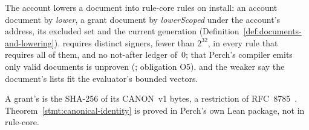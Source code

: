 The account lowers a document into rule-core rules on install: an account
document by \textit{lower}, a grant document by \textit{lowerScoped} under the
account's address, its excluded set and the current generation
(Definition~\ref{def:documents-and-lowering}).  requires distinct
signers, fewer than $2^{32}$, in every rule that requires all of them, and no
not-after ledger of~0; that Perch's compiler emits only valid documents is
unproven (; obligation O5). 
and the weaker  say the document's lists fit the evaluator's
bounded vectors.





\noindent A grant's  is the SHA-256 of its CANON~v1 bytes, a
restriction of RFC~8785~\cite{rfc8785}. Theorem~\ref{stmt:canonical-identity} is
proved in Perch's own Lean package, not in rule-core.


